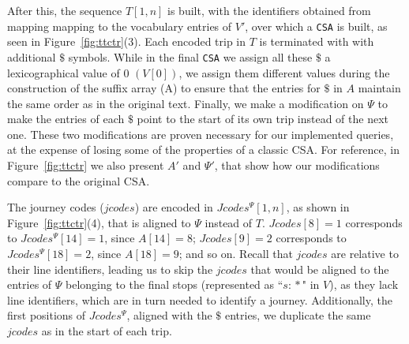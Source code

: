 \documentclass[runningheads]{llncs}
\newcommand{\ttctr}{TTCTR}
\begin{document}
After this, the sequence $T[1,n]$ is built, with the identifiers obtained from mapping mapping to the vocabulary entries of $V'$, over which a \texttt{CSA} is built, as seen in Figure~\ref{fig:ttctr}(3). Each encoded trip in $T$ is terminated with with additional $\$$ symbols. While in the final \texttt{CSA} we assign all these $\$$ a lexicographical value of 0 $(V[0])$, we assign them different values during the construction of the suffix array (A) to ensure that the entries for $\$$ in $A$ maintain the same order as in the original text. Finally, we make a modification on $\Psi$ to make the entries of each $\$$ point to the start of its own trip instead of the next one. These two modifications are proven necessary for our implemented queries, at the expense of losing some of the properties of a classic CSA. For reference, in Figure~\ref{fig:ttctr} we also present $A'$ and $\Psi'$, that show how our modifications compare to the original CSA.

The journey codes ($jcodes$) are encoded in $Jcodes^{\Psi}[1,n]$, as shown in Figure~\ref{fig:ttctr}(4), that is aligned to $\Psi$ instead of $T$. $Jcodes[8]= 1$ corresponds to $Jcodes^{\Psi}[14]=1$, since $A[14]=8$; $Jcodes[9]= 2$ corresponds to $Jcodes^{\Psi}[18]=2$, since $A[18]=9$; and so on. Recall that $jcodes$ are relative to their line identifiers, leading us to skip the $jcodes$ that would be aligned to the entries of $\Psi$ belonging to the final stops (represented as ``$s\!:\!*$" in $V$), as they lack line identifiers, which are in turn needed to identify a journey. Additionally, the first positions of $Jcodes^{\Psi}$, aligned with the $\$$ entries, we duplicate the same $jcodes$ as in the start of each trip.

\end{document}
